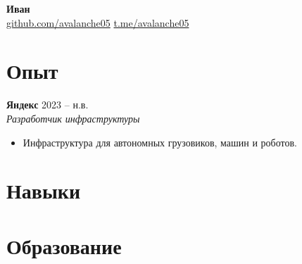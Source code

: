 \documentclass[11pt,a4paper]{article}
\begin{document}
\begin{center}
  {\LARGE \textbf{Иван}}\\[0.4em]
  \href{https://github.com/avalanche05}{github.com/avalanche05} \quad
  \href{https://t.me/avalanche05}{t.me/avalanche05}
\end{center}

\vspace{1em}

\section*{Опыт}

\textbf{Яндекс} \hfill 2023 -- н.в.\\
\textit{Разработчик инфраструктуры}
\begin{itemize}[leftmargin=*, itemsep=0pt]
  \item Инфраструктура для автономных грузовиков, машин и роботов.
\end{itemize}

\section*{Навыки}


\section*{Образование}

\end{document}
